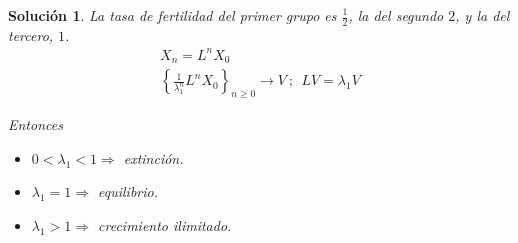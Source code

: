\documentclass[11pt, a4paper]{article}
\newif\IfInSansMode
\numberwithin{equation}{section}
\theoremstyle{theorem-style}
\theoremstyle{definition-style}
\theoremstyle{remark-style}
\newtheorem*{sol}{Solución}
\theoremstyle{example-style}
\begin{document}
\begin{sol}
    La tasa de fertilidad del primer grupo es $\frac{1}{2}$, la del segundo $2$, y la del tercero, $1$.
    \begin{align*}
        \label{}
        X_n = L^nX_0 \\
        \left\{ \frac{1}{\lambda_1^n} L^nX_0 \right\}_{n \geq 0} \rightarrow V \ ; \ \ LV = \lambda_1V
        \end{align*}

        Entonces \begin{itemize}
            \item $0 < \lambda_1 < 1 \Rightarrow$ extinción.
            \item $\lambda_1 = 1 \Rightarrow$ equilibrio.
            \item $\lambda_1 > 1 \Rightarrow$ crecimiento ilimitado.
        \end{itemize}
\end{sol}
\end{document}
